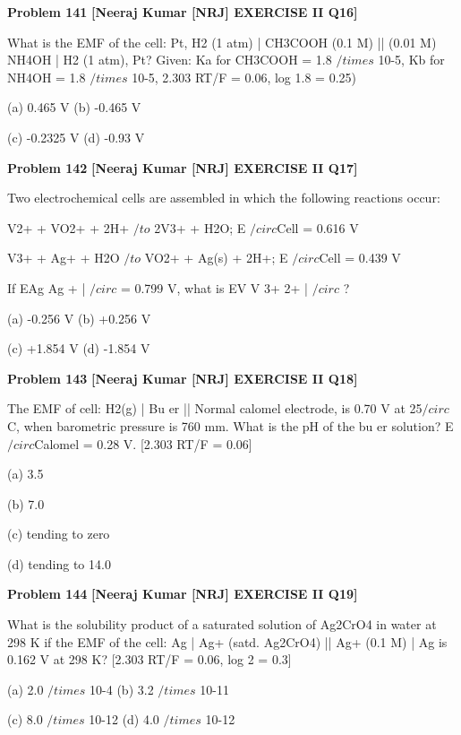 \begin{problembox}
\textbf{Problem 141} \hfill \textbf{[Neeraj Kumar [NRJ] EXERCISE II Q16]}
\label{q:ext-nrj_all_questions-141}

What is the EMF of the cell: Pt, H2 
(1 atm) | CH3COOH (0.1 M) || (0.01 M) NH4OH 
| H2 (1 atm), Pt? Given: Ka for CH3COOH = 1.8 $/times$ 
10-5, Kb for NH4OH = 1.8 $/times$ 10-5, 2.303 RT/F = 
0.06, log 1.8 = 0.25)
 
 (a) 0.465 V 
(b) -0.465 V
 
 (c) -0.2325 V 
(d) -0.93 V
\end{problembox}

\begin{problembox}
\textbf{Problem 142} \hfill \textbf{[Neeraj Kumar [NRJ] EXERCISE II Q17]}
\label{q:ext-nrj_all_questions-142}

Two electrochemical cells are assembled in which 
the following reactions occur:
 
   V2+ + VO2+ + 2H+ $/to$ 2V3+ + H2O; E $/circ$Cell = 
0.616 V
 
   V3+ + Ag+ + H2O $/to$ VO2+ + Ag(s) + 2H+; E $/circ$Cell 
= 0.439 V
 
 If EAg
Ag
+ |
$/circ$
 = 0.799 V, what is EV
V
3+
2+
|
$/circ$
?
 
 (a) -0.256 V 
(b) +0.256 V
 
 (c) +1.854 V 
(d) -1.854 V
\end{problembox}

\begin{problembox}
\textbf{Problem 143} \hfill \textbf{[Neeraj Kumar [NRJ] EXERCISE II Q18]}
\label{q:ext-nrj_all_questions-143}

The EMF of cell: H2(g) | Bu  er || Normal calomel 
electrode, is 0.70 V at 25$/circ$C, when barometric 
pressure is 760 mm. What is the pH of the bu  er 
solution? E $/circ$Calomel = 0.28 V. [2.303 RT/F = 0.06]
 
 (a) 3.5
 
 (b) 7.0
 
 (c) tending to zero
 
 (d) tending to 14.0
\end{problembox}

\begin{problembox}
\textbf{Problem 144} \hfill \textbf{[Neeraj Kumar [NRJ] EXERCISE II Q19]}
\label{q:ext-nrj_all_questions-144}

What is the solubility product of a saturated 
solution of Ag2CrO4 in water at 298 K if the EMF 
of the cell: Ag | Ag+ (satd. Ag2CrO4) || Ag+ (0.1 
M) | Ag is 0.162 V at 298 K? [2.303 RT/F = 0.06, 
log 2 = 0.3]
 
 (a) 2.0 $/times$ 10-4 
(b) 3.2 $/times$ 10-11
 
 (c) 8.0 $/times$ 10-12 
(d) 4.0 $/times$ 10-12
\end{problembox}


